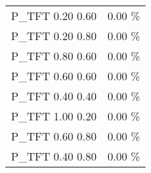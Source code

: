 \begin{tabular}{|l|r|}
P\_TFT 0.20 0.60              &    0.00 \% \\
P\_TFT 0.20 0.80              &    0.00 \% \\
P\_TFT 0.80 0.60              &    0.00 \% \\
P\_TFT 0.60 0.60              &    0.00 \% \\
P\_TFT 0.40 0.40              &    0.00 \% \\
P\_TFT 1.00 0.20              &    0.00 \% \\
P\_TFT 0.60 0.80              &    0.00 \% \\
P\_TFT 0.40 0.80              &    0.00 \% \\
\hline
\end{tabular}
